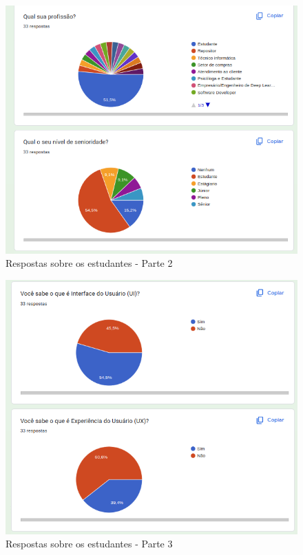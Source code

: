 \newpage

\begin{figure}[!h]
	\begin{center}
	    \includegraphics[scale=0.5]{figs/Answers/Students/02.png}
	\end{center}
	\caption{\label{APB_02}Respostas sobre os estudantes - Parte 2}
\end{figure}

\begin{figure}[!h]
	\begin{center}
	    \includegraphics[scale=0.5]{figs/Answers/Students/03.png}
	\end{center}
	\caption{\label{APB_03}Respostas sobre os estudantes - Parte 3}
\end{figure}

